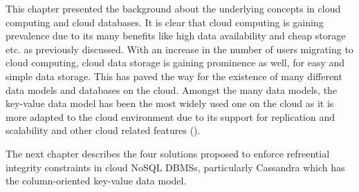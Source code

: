 This chapter presented the background about the underlying concepts in cloud
computing and cloud databases. It is clear that cloud computing is gaining
prevalence due to its many benefits like high data availability and cheap
storage etc. as previously discussed. With an increase in the number of users
migrating to cloud computing, cloud data storage is gaining prominence as well,
for easy and simple data storage. This has paved the way for the existence
of many different data models and databases on the cloud. Amongst the many data
models, the key-value data model has been the most widely used one on the cloud
as it is more adapted to the cloud environment due to its support for
replication and scalability and other cloud related features ().
	
The next chapter describes the four solutions proposed to enforce refreential
integrity constraints in cloud \ac{NoSQL} \acp{DBMS}, particularly
Cassandra which has the column-oriented key-value data model.





